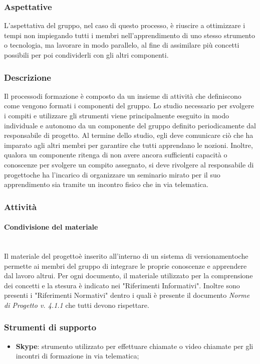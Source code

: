 		\subsubsection{Aspettative}
			L'aspettativa del gruppo, nel caso di questo processo\glo, è riuscire a ottimizzare i tempi non impiegando tutti i membri nell'apprendimento di uno stesso strumento o tecnologia, ma lavorare in modo parallelo, al fine di assimilare più concetti possibili per poi condividerli con gli altri componenti.
		\subsubsection{Descrizione}
			Il processo\glosp di formazione è composto da un insieme di attività che definiscono come vengono formati i componenti del gruppo.
			Lo studio necessario per svolgere i compiti e utilizzare gli strumenti viene principalmente eseguito in modo individuale e autonomo da un componente del gruppo definito periodicamente dal responsabile di progetto\glo. Al termine dello studio, egli deve comunicare ciò che ha imparato agli altri membri per garantire che tutti apprendano le nozioni.
			Inoltre, qualora un componente ritenga di non avere ancora sufficienti capacità o conoscenze per svolgere un compito assegnato, si deve rivolgere al responsabile di progetto\glosp che ha l'incarico di organizzare un seminario mirato per il suo apprendimento sia tramite un incontro fisico che in via telematica.
		\subsubsection{Attività}
		\paragraph{Condivisione del materiale}\mbox{}\\ [1mm]
			Il materiale del progetto\glosp è inserito all'interno di un sistema di versionamento\glosp che permette ai membri del gruppo di integrare le proprie conoscenze e apprendere dal lavoro altrui.
			Per ogni documento, il materiale utilizzato per la comprensione dei concetti e la stesura è indicato nei "Riferimenti Informativi".
			Inoltre sono presenti i "Riferimenti Normativi" dentro i quali è presente il documento \textit{Norme di Progetto v. 4.1.1} che tutti devono rispettare.
		\subsubsection{Strumenti di supporto}
		\begin{itemize}
		 	\item \textbf{Skype}: strumento utilizzato per effettuare chiamate o video chiamate per gli incontri di formazione in via telematica;
	 	\end{itemize}
			
